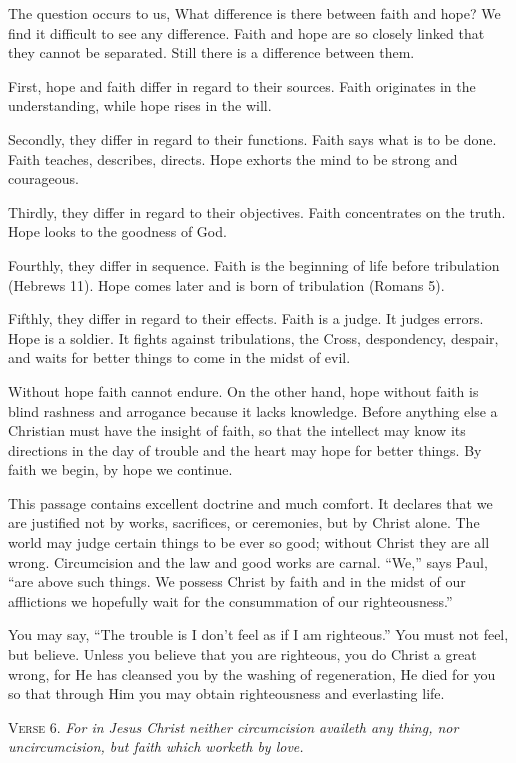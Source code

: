The question occurs to us, What difference is there between faith and hope? We find it difficult to see any difference. Faith and hope are so closely linked that they cannot be separated. Still there is a difference between them.

First, hope and faith differ in regard to their sources. Faith originates in the understanding, while hope rises in the will.

Secondly, they differ in regard to their functions. Faith says what is to be done. Faith teaches, describes, directs. Hope exhorts the mind to be strong and courageous.

Thirdly, they differ in regard to their objectives. Faith concentrates on the truth. Hope looks to the goodness of God.

Fourthly, they differ in sequence. Faith is the beginning of life before tribulation (Hebrews 11). Hope comes later and is born of tribulation (Romans 5).

Fifthly, they differ in regard to their effects. Faith is a judge. It judges errors. Hope is a soldier. It fights against tribulations, the Cross, despondency, despair, and waits for better things to come in the midst of evil.

Without hope faith cannot endure. On the other hand, hope without faith is blind rashness and arrogance because it lacks knowledge. Before anything else a Christian must have the insight of faith, so that the intellect may know its directions in the day of trouble and the heart may hope for better things. By faith we begin, by hope we continue.

This passage contains excellent doctrine and much comfort. It declares that we are justified not by works, sacrifices, or ceremonies, but by Christ alone. The world may judge certain things to be ever so good; without Christ they are all wrong. Circumcision and the law and good works are carnal. “We,” says Paul, “are above such things. We possess Christ by faith and in the midst of our afflictions we hopefully wait for the consummation of our righteousness.”

You may say, “The trouble is I don’t feel as if I am righteous.” You must not feel, but believe. Unless you believe that you are righteous, you do Christ a great wrong, for He has cleansed you by the washing of regeneration, He died for you so that through Him you may obtain righteousness and everlasting life.

\textsc{Verse} 6. \emph{For in Jesus Christ neither circumcision availeth any thing, nor uncircumcision, but faith which worketh by love.}

